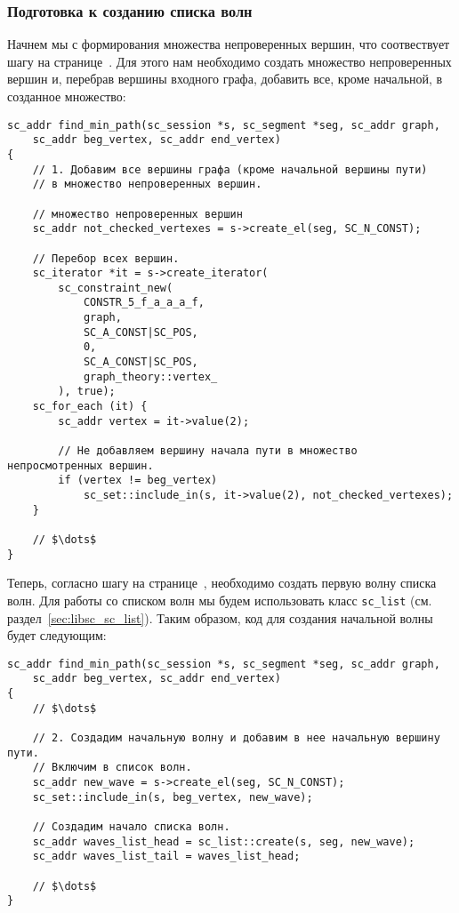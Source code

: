 \subsubsection{Подготовка к созданию списка волн}
\label{sec:libscprg_fmp_before_waves_list}

Начнем мы с формирования множества непроверенных вершин, что
соотвествует шагу на
странице~\pageref{astep:S2_Create_unchecked_vertexes_set}. Для этого
нам необходимо создать множество непроверенных вершин и, перебрав
вершины входного графа, добавить все, кроме начальной, в созданное
множество:
\begin{lstlisting}[texcl]
sc_addr find_min_path(sc_session *s, sc_segment *seg, sc_addr graph,
    sc_addr beg_vertex, sc_addr end_vertex)
{
    // 1. Добавим все вершины графа (кроме начальной вершины пути)
    // в множество непроверенных вершин.

    // множество непроверенных вершин
    sc_addr not_checked_vertexes = s->create_el(seg, SC_N_CONST);

    // Перебор всех вершин.
    sc_iterator *it = s->create_iterator(
        sc_constraint_new(
            CONSTR_5_f_a_a_a_f,
            graph,
            SC_A_CONST|SC_POS,
            0,
            SC_A_CONST|SC_POS,
            graph_theory::vertex_
        ), true);
    sc_for_each (it) {
        sc_addr vertex = it->value(2);

        // Не добавляем вершину начала пути в множество непросмотренных вершин.
        if (vertex != beg_vertex)
            sc_set::include_in(s, it->value(2), not_checked_vertexes);
    }

    // $\dots$
}
\end{lstlisting}

Теперь, согласно шагу на странице~\pageref{astep:S3_Create_1st_wave},
необходимо создать первую волну списка волн. Для работы со списком
волн мы будем использовать класс \lstinline|sc_list|
(см. раздел~\ref{sec:libsc_sc_list}). Таким образом, код для создания
начальной волны будет следующим:
\begin{lstlisting}[texcl]
sc_addr find_min_path(sc_session *s, sc_segment *seg, sc_addr graph,
    sc_addr beg_vertex, sc_addr end_vertex)
{
    // $\dots$

    // 2. Создадим начальную волну и добавим в нее начальную вершину пути.
    // Включим в список волн.
    sc_addr new_wave = s->create_el(seg, SC_N_CONST);
    sc_set::include_in(s, beg_vertex, new_wave);

    // Создадим начало списка волн.
    sc_addr waves_list_head = sc_list::create(s, seg, new_wave);
    sc_addr waves_list_tail = waves_list_head;

    // $\dots$
}
\end{lstlisting}

